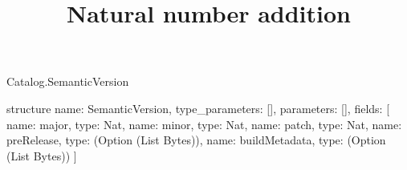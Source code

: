\begin{lexlean}{Catalog.SemanticVersion}
\title{Natural number addition}
\begin{semanticmodule}
structure{
  name: SemanticVersion,
  type_parameters: [],
  parameters: [],
  fields: [
    {name: major, type: Nat},
    {name: minor, type: Nat},
    {name: patch, type: Nat},
    {name: preRelease, type: (Option (List Bytes))},
    {name: buildMetadata, type: (Option (List Bytes))}
  ]
}
\end{semanticmodule}
\end{lexlean}
